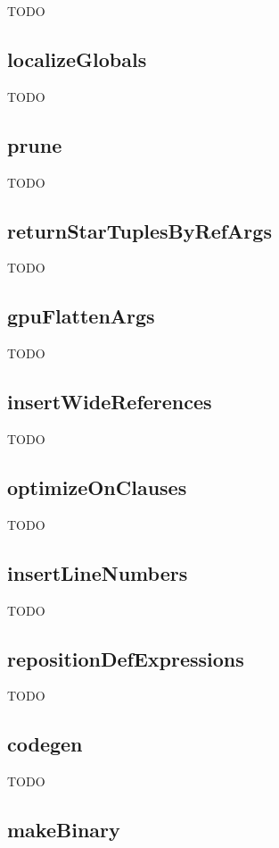 \documentclass[10pt]{article}
\begin{document}
TODO

\subsection{localizeGlobals}

TODO

\subsection{prune}

TODO

\subsection{returnStarTuplesByRefArgs}

TODO

\subsection{gpuFlattenArgs}

TODO

\subsection{insertWideReferences}

TODO

\subsection{optimizeOnClauses}

TODO

\subsection{insertLineNumbers}

TODO

\subsection{repositionDefExpressions}

TODO

\subsection{codegen}

TODO

\subsection{makeBinary}
\end{document}
